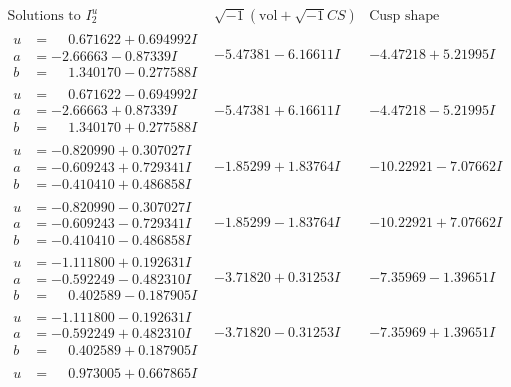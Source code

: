 \documentclass[1p]{elsarticle_modified}
\theoremstyle{definition}
\newcommand{\I}{\sqrt{-1}}
\begin{document}
$$\begin{array}{c|c|c}  
\text{Solutions to }I^u_{2}& \I (\text{vol} + \sqrt{-1}CS) & \text{Cusp shape}\\
 \hline 
\begin{aligned}
u &= \phantom{-}0.671622 + 0.694992 I \\
a &= -2.66663 - 0.87339 I \\
b &= \phantom{-}1.340170 - 0.277588 I\end{aligned}
 & -5.47381 - 6.16611 I & -4.47218 + 5.21995 I \\ \hline\begin{aligned}
u &= \phantom{-}0.671622 - 0.694992 I \\
a &= -2.66663 + 0.87339 I \\
b &= \phantom{-}1.340170 + 0.277588 I\end{aligned}
 & -5.47381 + 6.16611 I & -4.47218 - 5.21995 I \\ \hline\begin{aligned}
u &= -0.820990 + 0.307027 I \\
a &= -0.609243 + 0.729341 I \\
b &= -0.410410 + 0.486858 I\end{aligned}
 & -1.85299 + 1.83764 I & -10.22921 - 7.07662 I \\ \hline\begin{aligned}
u &= -0.820990 - 0.307027 I \\
a &= -0.609243 - 0.729341 I \\
b &= -0.410410 - 0.486858 I\end{aligned}
 & -1.85299 - 1.83764 I & -10.22921 + 7.07662 I \\ \hline\begin{aligned}
u &= -1.111800 + 0.192631 I \\
a &= -0.592249 - 0.482310 I \\
b &= \phantom{-}0.402589 - 0.187905 I\end{aligned}
 & -3.71820 + 0.31253 I & -7.35969 - 1.39651 I \\ \hline\begin{aligned}
u &= -1.111800 - 0.192631 I \\
a &= -0.592249 + 0.482310 I \\
b &= \phantom{-}0.402589 + 0.187905 I\end{aligned}
 & -3.71820 - 0.31253 I & -7.35969 + 1.39651 I \\ \hline\begin{aligned}
u &= \phantom{-}0.973005 + 0.667865 I \\

\end{aligned}
\end{array}$$
\end{document}

